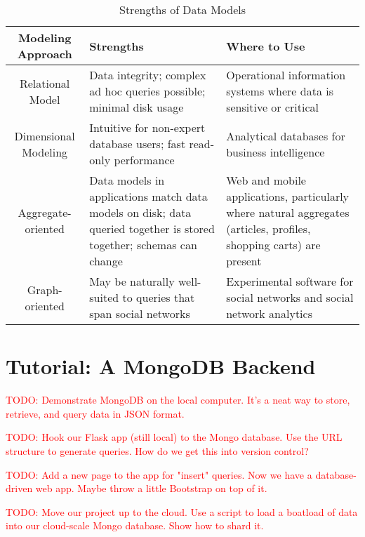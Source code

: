 \documentclass[11pt]{book}
\newcommand{\head}[1]{\textnormal{\textbf{#1}}} %
\newcommand{\todo}[1]{\textcolor{red}{TODO: #1}} %
\begin{document}
\begin{table}
\centering
\caption{Strengths of Data Models}
\vspace{10pt}
\begin{tabular}{cp{4cm}p{4cm}}
    \toprule[1.5pt]
    \head{Modeling Approach} & \head{Strengths} & \head{Where to Use} \\
    \midrule
    Relational Model & Data integrity; complex ad hoc queries possible; minimal disk usage & Operational information systems where data is sensitive or critical\\
    \midrule
    Dimensional Modeling & Intuitive for non-expert database users; fast read-only performance & Analytical databases for business intelligence\\
    \midrule
    Aggregate-oriented & Data models in applications match data models on disk; data queried together is stored together; schemas can change & Web and mobile applications, particularly where natural aggregates (articles, profiles, shopping carts) are present \\
    \midrule
    Graph-oriented & May be naturally well-suited to queries that span social networks & Experimental software for social networks and social network analytics \\
    \bottomrule[1.5pt]
\end{tabular}
\end{table}



\section*{Tutorial: A MongoDB Backend}

\todo{Demonstrate MongoDB on the local computer.  It's a neat way to store, retrieve, and query data in JSON format.}

\todo{Hook our Flask app (still local) to the Mongo database. Use the URL structure to generate queries. How do we get this into version control?}

\todo{Add a new page to the app for "insert" queries.  Now we have a database-driven web app.  Maybe throw a little Bootstrap on top of it.}

\todo{Move our project up to the cloud.  Use a script to load a boatload of data into our cloud-scale Mongo database.  Show how to shard it.}
\end{document}
